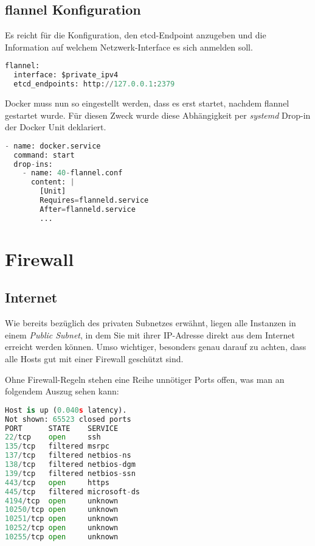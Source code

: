 \subsection{flannel Konfiguration}
Es reicht für die Konfiguration, den etcd-Endpoint anzugeben und die Information
auf welchem Netzwerk-Interface es sich anmelden soll.
\begin{lstlisting}[language=Python,numbers=none]
flannel:
  interface: $private_ipv4
  etcd_endpoints: http://127.0.0.1:2379\end{lstlisting}

Docker muss nun so eingestellt werden, dass es erst startet, nachdem flannel
gestartet wurde. Für diesen Zweck wurde diese Abhängigkeit per
\emph{systemd} Drop-in der Docker Unit deklariert.

\begin{lstlisting}[language=Python,numbers=none]
- name: docker.service
  command: start
  drop-ins:
    - name: 40-flannel.conf
      content: |
        [Unit]
        Requires=flanneld.service
        After=flanneld.service
        ...\end{lstlisting}

\section{Firewall}

\subsection{Internet}

Wie bereits bezüglich des privaten Subnetzes erwähnt, liegen alle Instanzen in
einem \emph{Public Subnet}, in dem Sie mit ihrer IP-Adresse direkt aus dem Internet erreicht werden können.
Umso wichtiger, besonders genau darauf zu achten, dass alle Hosts gut
mit einer Firewall geschützt sind.

Ohne Firewall-Regeln stehen eine Reihe unnötiger Ports offen,
was man an folgendem  Auszug sehen kann:

\begin{lstlisting}[language=Python,numbers=none]
Host is up (0.040s latency).
Not shown: 65523 closed ports
PORT      STATE    SERVICE
22/tcp    open     ssh
135/tcp   filtered msrpc
137/tcp   filtered netbios-ns
138/tcp   filtered netbios-dgm
139/tcp   filtered netbios-ssn
443/tcp   open     https
445/tcp   filtered microsoft-ds
4194/tcp  open     unknown
10250/tcp open     unknown
10251/tcp open     unknown
10252/tcp open     unknown
10255/tcp open     unknown\end{lstlisting}


